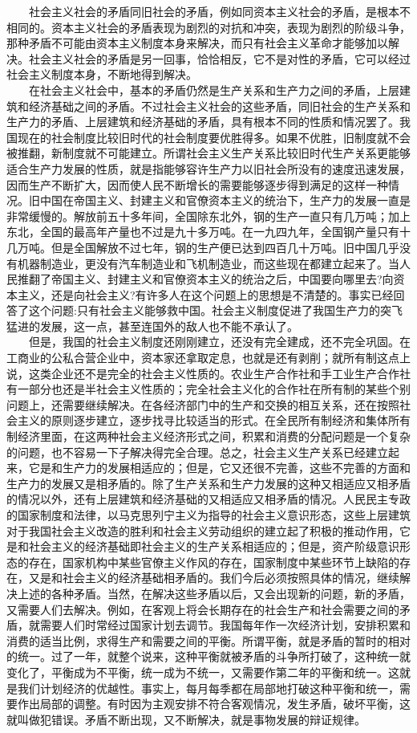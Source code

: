 \documentclass[cn,11pt,chinese]{elegantbook}
\begin{document}
　　社会主义社会的矛盾同旧社会的矛盾，例如同资本主义社会的矛盾，是根本不相同的。资本主义社会的矛盾表现为剧烈的对抗和冲突，表现为剧烈的阶级斗争，那种矛盾不可能由资本主义制度本身来解决，而只有社会主义革命才能够加以解决。社会主义社会的矛盾是另一回事，恰恰相反，它不是对性的矛盾，它可以经过社会主义制度本身，不断地得到解决。\\
　　在社会主义社会中，基本的矛盾仍然是生产关系和生产力之间的矛盾，上层建筑和经济基础之间的矛盾。不过社会主义社会的这些矛盾，同旧社会的生产关系和生产力的矛盾、上层建筑和经济基础的矛盾，具有根本不同的性质和情况罢了。我国现在的社会制度比较旧时代的社会制度要优胜得多。如果不优胜，旧制度就不会被推翻，新制度就不可能建立。所谓社会主义生产关系比较旧时代生产关系更能够适合生产力发展的性质，就是指能够容许生产力以旧社会所没有的速度迅速发展，因而生产不断扩大，因而使人民不断增长的需要能够逐步得到满足的这样一种情况。旧中国在帝国主义、封建主义和官僚资本主义的统治下，生产力的发展一直是非常缓慢的。解放前五十多年间，全国除东北外，钢的生产一直只有几万吨；加上东北，全国的最高年产量也不过是九十多万吨。在一九四九年，全国钢产量只有十几万吨。但是全国解放不过七年，钢的生产便已达到四百几十万吨。旧中国几乎没有机器制造业，更没有汽车制造业和飞机制造业，而这些现在都建立起来了。当人民推翻了帝国主义、封建主义和官僚资本主义的统治之后，中国要向哪里去?向资本主义，还是向社会主义?有许多人在这个问题上的思想是不清楚的。事实已经回答了这个问题:只有社会主义能够救中国。社会主义制度促进了我国生产力的突飞猛进的发展，这一点，甚至连国外的敌人也不能不承认了。\\
　　但是，我国的社会主义制度还刚刚建立，还没有完全建成，还不完全巩固。在工商业的公私合营企业中，资本家还拿取定息，也就是还有剥削；就所有制这点上说，这类企业还不是完全的社会主义性质的。农业生产合作社和手工业生产合作社有一部分也还是半社会主义性质的；完全社会主义化的合作社在所有制的某些个别问题上，还需要继续解决。在各经济部门中的生产和交换的相互关系，还在按照社会主义的原则逐步建立，逐步找寻比较适当的形式。在全民所有制经济和集体所有制经济里面，在这两种社会主义经济形式之间，积累和消费的分配问题是一个复杂的问题，也不容易一下子解决得完全合理。总之，社会主义生产关系已经建立起来，它是和生产力的发展相适应的；但是，它又还很不完善，这些不完善的方面和生产力的发展又是相矛盾的。除了生产关系和生产力发展的这种又相适应又相矛盾的情况以外，还有上层建筑和经济基础的又相适应又相矛盾的情况。人民民主专政的国家制度和法律，以马克思列宁主义为指导的社会主义意识形态，这些上层建筑对于我国社会主义改造的胜利和社会主义劳动组织的建立起了积极的推动作用，它是和社会主义的经济基础即社会主义的生产关系相适应的；但是，资产阶级意识形态的存在，国家机构中某些官僚主义作风的存在，国家制度中某些环节上缺陷的存在，又是和社会主义的经济基础相矛盾的。我们今后必须按照具体的情况，继续解决上述的各种矛盾。当然，在解决这些矛盾以后，又会出现新的问题，新的矛盾，又需要人们去解决。例如，在客观上将会长期存在的社会生产和社会需要之间的矛盾，就需要人们时常经过国家计划去调节。我国每年作一次经济计划，安排积累和消费的适当比例，求得生产和需要之间的平衡。所谓平衡，就是矛盾的暂时的相对的统一。过了一年，就整个说来，这种平衡就被矛盾的斗争所打破了，这种统一就变化了，平衡成为不平衡，统一成为不统一，又需要作第二年的平衡和统一。这就是我们计划经济的优越性。事实上，每月每季都在局部地打破这种平衡和统一，需要作出局部的调整。有时因为主观安排不符合客观情况，发生矛盾，破坏平衡，这就叫做犯错误。矛盾不断出现，又不断解决，就是事物发展的辩证规律。\\
\end{document}
